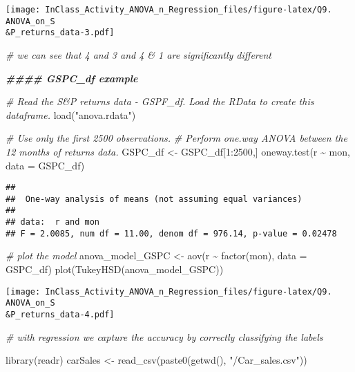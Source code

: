\documentclass[
]{article}
\newenvironment{Shaded}{\begin{snugshade}}{\end{snugshade}}
\newcommand{\AttributeTok}[1]{\textcolor[rgb]{0.77,0.63,0.00}{#1}}
\newcommand{\CommentTok}[1]{\textcolor[rgb]{0.56,0.35,0.01}{\textit{#1}}}
\newcommand{\DecValTok}[1]{\textcolor[rgb]{0.00,0.00,0.81}{#1}}
\newcommand{\DocumentationTok}[1]{\textcolor[rgb]{0.56,0.35,0.01}{\textbf{\textit{#1}}}}
\newcommand{\FunctionTok}[1]{\textcolor[rgb]{0.00,0.00,0.00}{#1}}
\newcommand{\NormalTok}[1]{#1}
\newcommand{\OtherTok}[1]{\textcolor[rgb]{0.56,0.35,0.01}{#1}}
\newcommand{\SpecialCharTok}[1]{\textcolor[rgb]{0.00,0.00,0.00}{#1}}
\newcommand{\StringTok}[1]{\textcolor[rgb]{0.31,0.60,0.02}{#1}}
\begin{document}
\texttt{[image: InClass\_Activity\_ANOVA\_n\_Regression\_files/figure-latex/Q9. ANOVA\_on\_S\\\&P\_returns\_data-3.pdf]}

\begin{Shaded}
\begin{Highlighting}[]
\CommentTok{\# we can see that 4 and 3 and 4 \& 1 are significantly different}

\DocumentationTok{\#\#\#\# GSPC\_df example}

\CommentTok{\# Read the S\&P returns data {-} GSPF\_df. Load the RData to create this dataframe. }
\FunctionTok{load}\NormalTok{(}\StringTok{"anova.rdata"}\NormalTok{)}

\CommentTok{\# Use only the first 2500 observations. }
\CommentTok{\# Perform one.way ANOVA between the 12 months of returns data.}
\NormalTok{GSPC\_df }\OtherTok{\textless{}{-}}\NormalTok{ GSPC\_df[}\DecValTok{1}\SpecialCharTok{:}\DecValTok{2500}\NormalTok{,]}
\FunctionTok{oneway.test}\NormalTok{(r }\SpecialCharTok{\textasciitilde{}}\NormalTok{ mon,}
            \AttributeTok{data =}\NormalTok{ GSPC\_df)}
\end{Highlighting}
\end{Shaded}

\begin{verbatim}
## 
##  One-way analysis of means (not assuming equal variances)
## 
## data:  r and mon
## F = 2.0085, num df = 11.00, denom df = 976.14, p-value = 0.02478
\end{verbatim}

\begin{Shaded}
\begin{Highlighting}[]
\CommentTok{\# plot the model}
\NormalTok{anova\_model\_GSPC }\OtherTok{\textless{}{-}} \FunctionTok{aov}\NormalTok{(r }\SpecialCharTok{\textasciitilde{}} \FunctionTok{factor}\NormalTok{(mon),}
                   \AttributeTok{data =}\NormalTok{ GSPC\_df)}
\FunctionTok{plot}\NormalTok{(}\FunctionTok{TukeyHSD}\NormalTok{(anova\_model\_GSPC))}
\end{Highlighting}
\end{Shaded}

\texttt{[image: InClass\_Activity\_ANOVA\_n\_Regression\_files/figure-latex/Q9. ANOVA\_on\_S\\\&P\_returns\_data-4.pdf]}

\begin{Shaded}
\begin{Highlighting}[]
\CommentTok{\# with regression we capture the accuracy by correctly classifying the labels}

\FunctionTok{library}\NormalTok{(readr)}
\NormalTok{carSales }\OtherTok{\textless{}{-}} \FunctionTok{read\_csv}\NormalTok{(}\FunctionTok{paste0}\NormalTok{(}\FunctionTok{getwd}\NormalTok{(), }\StringTok{"/Car\_sales.csv"}\NormalTok{))}
\end{Highlighting}
\end{Shaded}
\end{document}
